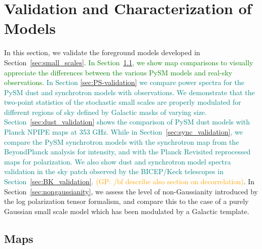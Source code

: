 \documentclass[twocolumn]{aastex631}
\newcommand{\giuse}[1]{\textcolor{orange}{(GP: #1)}}
\newcommand{\sg}[1]{\textcolor{teal}{#1}}
\newcommand{\jd}[1]{\textcolor{green}{#1}}
\begin{document}
\section{Validation and Characterization of Models} \label{sec:validation}

In this section, we validate the foreground models developed in Section~\ref{sec:small_scales}.
%
\jd{In Section~\ref{subsec:maps}, we show map comparisons to visually appreciate the differences between the various PySM models and real-sky observations.}
%
%
\sg{In Section \ref{sec:PS-validation} we compare power spectra for the PySM dust and synchrotron models with observations. We demonstrate that the two-point statistics of the stochastic small scales are properly modulated for different regions of sky defined by Galactic masks of varying size. Section~\ref{sec:dust_validation} shows the comparison of PySM dust models with Planck NPIPE maps at 353 GHz. 
While in Section~\ref{sec:sync_validation}, we compare the PySM synchrotron models with the synchrotron map from the BeyondPlanck analysis for intensity, and with the Planck Revisited reprocessed maps for polarization. We also show dust and synchrotron model spectra validation in the sky patch observed by the BICEP/Keck telescopes in Section~\ref{sec:BK_validation}.}
%
\giuse{/bf describe also section on decorrelation}. In Section~\ref{sec:nongaussianity}, we assess the level of non-Gaussianity introduced by the log polarization tensor formalism, and compare this to the case of a purely Gaussian small scale model which has been modulated by a Galactic template. 


\subsection{Maps}\label{subsec:maps}
\end{document}
